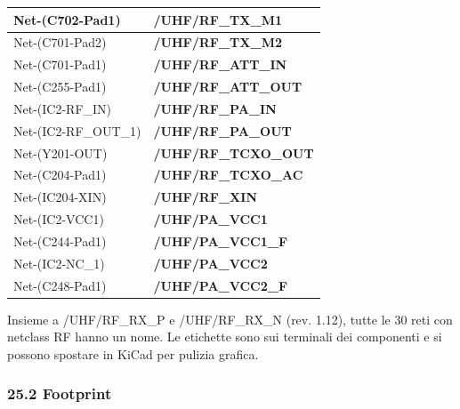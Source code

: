 {\begin{longtable}{>{\raggedright\arraybackslash}p{}>{\raggedright\arraybackslash}p{}}
Net-(C702-Pad1) & \textbf{/\allowbreak{}UHF/\allowbreak{}RF\_\allowbreak{}TX\_\allowbreak{}M1} \\\midrule[0.15pt]
Net-(C701-Pad2) & \textbf{/\allowbreak{}UHF/\allowbreak{}RF\_\allowbreak{}TX\_\allowbreak{}M2} \\\midrule[0.15pt]
Net-(C701-Pad1) & \textbf{/\allowbreak{}UHF/\allowbreak{}RF\_\allowbreak{}ATT\_\allowbreak{}IN} \\\midrule[0.15pt]
Net-(C255-Pad1) & \textbf{/\allowbreak{}UHF/\allowbreak{}RF\_\allowbreak{}ATT\_\allowbreak{}OUT} \\\midrule[0.15pt]
Net-(IC2-RF\_\allowbreak{}IN) & \textbf{/\allowbreak{}UHF/\allowbreak{}RF\_\allowbreak{}PA\_\allowbreak{}IN} \\\midrule[0.15pt]
Net-(IC2-RF\_\allowbreak{}OUT\_\allowbreak{}1) & \textbf{/\allowbreak{}UHF/\allowbreak{}RF\_\allowbreak{}PA\_\allowbreak{}OUT} \\\midrule[0.15pt]
Net-(Y201-OUT) & \textbf{/\allowbreak{}UHF/\allowbreak{}RF\_\allowbreak{}TCXO\_\allowbreak{}OUT} \\\midrule[0.15pt]
Net-(C204-Pad1) & \textbf{/\allowbreak{}UHF/\allowbreak{}RF\_\allowbreak{}TCXO\_\allowbreak{}AC} \\\midrule[0.15pt]
Net-(IC204-XIN) & \textbf{/\allowbreak{}UHF/\allowbreak{}RF\_\allowbreak{}XIN} \\\midrule[0.15pt]
Net-(IC2-VCC1) & \textbf{/\allowbreak{}UHF/\allowbreak{}PA\_\allowbreak{}VCC1} \\\midrule[0.15pt]
Net-(C244-Pad1) & \textbf{/\allowbreak{}UHF/\allowbreak{}PA\_\allowbreak{}VCC1\_\allowbreak{}F} \\\midrule[0.15pt]
Net-(IC2-NC\_\allowbreak{}1) & \textbf{/\allowbreak{}UHF/\allowbreak{}PA\_\allowbreak{}VCC2} \\\midrule[0.15pt]
Net-(C248-Pad1) & \textbf{/\allowbreak{}UHF/\allowbreak{}PA\_\allowbreak{}VCC2\_\allowbreak{}F} \\
\end{longtable}}

Insieme a /\allowbreak{}UHF/\allowbreak{}RF\_\allowbreak{}RX\_\allowbreak{}P e /\allowbreak{}UHF/\allowbreak{}RF\_\allowbreak{}RX\_\allowbreak{}N (rev. 1.12), tutte le 30 reti con netclass RF hanno un nome. Le etichette sono sui terminali dei componenti e si possono spostare in KiCad per pulizia grafica.

\subsubsection[25.2 Footprint]{25.2 Footprint}

